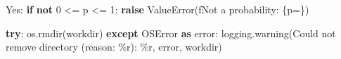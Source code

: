 \documentclass[
]{article}
\newenvironment{Shaded}{}{}
\newcommand{\ControlFlowTok}[1]{\textcolor[rgb]{0.00,0.44,0.13}{\textbf{#1}}}
\newcommand{\DecValTok}[1]{\textcolor[rgb]{0.25,0.63,0.44}{#1}}
\newcommand{\ImportTok}[1]{\textcolor[rgb]{0.00,0.50,0.00}{\textbf{#1}}}
\newcommand{\KeywordTok}[1]{\textcolor[rgb]{0.00,0.44,0.13}{\textbf{#1}}}
\newcommand{\NormalTok}[1]{#1}
\newcommand{\OperatorTok}[1]{\textcolor[rgb]{0.40,0.40,0.40}{#1}}
\newcommand{\PreprocessorTok}[1]{\textcolor[rgb]{0.74,0.48,0.00}{#1}}
\newcommand{\SpecialCharTok}[1]{\textcolor[rgb]{0.25,0.44,0.63}{#1}}
\newcommand{\SpecialStringTok}[1]{\textcolor[rgb]{0.73,0.40,0.53}{#1}}
\newcommand{\StringTok}[1]{\textcolor[rgb]{0.25,0.44,0.63}{#1}}
\begin{document}
\begin{samepage}
\begin{Shaded}
\begin{Highlighting}[]
\NormalTok{  Yes:}
  \ControlFlowTok{if} \KeywordTok{not} \DecValTok{0} \OperatorTok{\textless{}=}\NormalTok{ p }\OperatorTok{\textless{}=} \DecValTok{1}\NormalTok{:}
    \ControlFlowTok{raise} \PreprocessorTok{ValueError}\NormalTok{(}\SpecialStringTok{f\textquotesingle{}Not a probability: }\SpecialCharTok{\{}\NormalTok{p}\OperatorTok{=}\SpecialCharTok{\}}\SpecialStringTok{\textquotesingle{}}\NormalTok{)}

  \ControlFlowTok{try}\NormalTok{:}
\NormalTok{    os.rmdir(workdir)}
  \ControlFlowTok{except} \PreprocessorTok{OSError} \ImportTok{as}\NormalTok{ error:}
\NormalTok{    logging.warning(}\StringTok{\textquotesingle{}Could not remove directory (reason: }\SpecialCharTok{\%r}\StringTok{): }\SpecialCharTok{\%r}\StringTok{\textquotesingle{}}\NormalTok{,}
\NormalTok{                    error, workdir)}
\end{Highlighting}
\end{Shaded}
\end{samepage}
\end{document}
